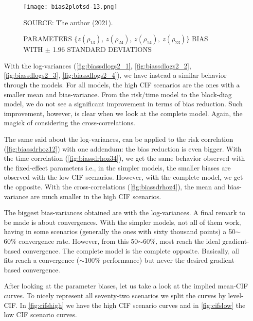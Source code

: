 \begin{figure}[H]
 \setlength{\abovecaptionskip}{.0001pt}
 \caption{PARAMETERS
          \(\{z(\rho_{13}),~z(\rho_{24}),~z(\rho_{14}),~z(\rho_{23})\}\)
          BIAS WITH \(\pm\) 1.96 STANDARD DEVIATIONS}
 \vspace{0.2cm}\centering
 \texttt{[image: bias2plotsd-13.png]}\\
 \begin{footnotesize}
  SOURCE: The author (2021).
 \end{footnotesize}
 \label{fig:biassdrhoz4}
\end{figure}

With the log-variances (\autoref{fig:biassdlogs2_1},
\autoref{fig:biassdlogs2_2}, \autoref{fig:biassdlogs2_3},
\autoref{fig:biassdlogs2_4}), we have instead a similar behavior through
the models. For all models, the high CIF scenarios are the ones with a
smaller mean and bias-variance. From the risk/time model to the
block-diag model, we do not see a significant improvement in terms of
bias reduction. Such improvement, however, is clear when we look at the
complete model. Again, the magick of considering the cross-correlations.

The same said about the log-variances, can be applied to the risk
correlation (\autoref{fig:biassdrhoz12}) with one addendum: the bias
reduction is even bigger. With the time correlation
(\autoref{fig:biassdrhoz34}), we get the same behavior observed with the
fixed-effect parameters i.e., in the simpler models, the smaller biases
are observed with the low CIF scenarios. However, with the complete
model, we get the opposite. With the cross-correlations
(\autoref{fig:biassdrhoz4}), the mean and bias-variance are much smaller
in the high CIF scenarios.

The biggest bias-variances obtained are with the log-variances. A final
remark to be made is about convergences. With the simpler models, not
all of them work, having in some scenarios (generally the ones with
sixty thousand points) a 50\(\sim\)60\% convergence rate. However, from
this 50\(\sim\)60\%, most reach the ideal gradient-based
convergence. The complete model is the complete opposite. Basically, all
fits reach a convergence (\(\sim\)100\% performance) but never the
desired gradient-based convergence.

After looking at the parameter biases, let us take a look at the implied
mean-CIF curves. To nicely represent all seventy-two scenarios we split
the curves by level-CIF. In \autoref{fig:cifshigh} we have the high CIF
scenario curves and in \autoref{fig:cifslow} the low CIF scenario
curves.

